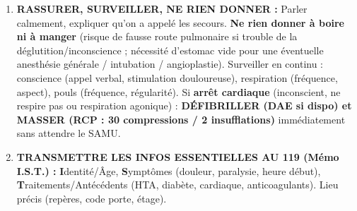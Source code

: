 \documentclass[11pt]{article}
\begin{document}
\begin{methode}
\begin{enumerate}
    \item \textbf{RASSURER, SURVEILLER, NE RIEN DONNER :} Parler calmement, expliquer qu'on a appelé les secours. \textbf{Ne rien donner à boire ni à manger} (risque de fausse route pulmonaire si trouble de la déglutition/inconscience ; nécessité d'estomac vide pour une éventuelle anesthésie générale / intubation / angioplastie). Surveiller en continu : conscience (appel verbal, stimulation douloureuse), respiration (fréquence, aspect), pouls (fréquence, régularité). Si \textbf{arrêt cardiaque} (inconscient, ne respire pas ou respiration agonique) : \textbf{DÉFIBRILLER (DAE si dispo) et MASSER (RCP : 30 compressions / 2 insufflations)} immédiatement sans attendre le SAMU.
    \item \textbf{TRANSMETTRE LES INFOS ESSENTIELLES AU 119 (Mémo I.S.T.) :} \textbf{I}dentité/Âge, \textbf{S}ymptômes (douleur, paralysie, heure début), \textbf{T}raitements/Antécédents (HTA, diabète, cardiaque, anticoagulants). Lieu précis (repères, code porte, étage).
\end{enumerate}
\end{methode}
\end{document}
